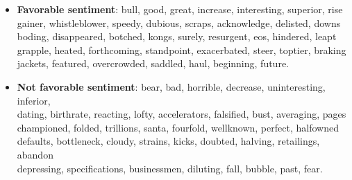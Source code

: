 \begin{itemize}
	\item \textbf{Favorable sentiment}:
	bull, good, great, increase, interesting, superior, rise\\
	gainer, whistleblower, speedy, dubious, scraps, acknowledge, delisted, downs\\
	boding, disappeared, botched, kongs, surely, resurgent, eos, hindered, leapt\\
	grapple, heated, forthcoming, standpoint, exacerbated, steer, toptier, braking\\
	jackets, featured, overcrowded, saddled, haul, beginning, future.
	\item \textbf{Not favorable sentiment}:
	bear, bad, horrible, decrease, uninteresting, inferior,\\
	dating, birthrate, reacting, lofty, accelerators, falsified, bust, averaging, pages\\
	championed, folded, trillions, santa, fourfold, wellknown, perfect, halfowned\\
	defaults, bottleneck, cloudy, strains, kicks, doubted, halving, retailings, abandon\\
	depressing, specifications, businessmen, diluting, fall, bubble, past, fear.
	
\end{itemize}



